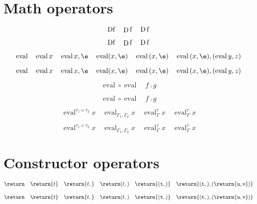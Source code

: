 \documentclass{article}
\DeclareMathOperator{\eval}{eval}
\begin{document}
\section{Math operators}

\begin{verbatim*}

\DeclareMathOperator{\eval}{eval}
\DeclareMathInfix{\comp}{;}
\end{verbatim*}

\begin{verbatim*}
\[
\mathfont{D} f\quad
\mathop{D} f\quad
\mymathop{D} f
\]
\end{verbatim*}
%
\[
  \mathfont{D} f \quad
  \mathop{D} f \quad
  \mymathop{D} f
\]

\begin{verbatim*}
\[
\eval\quad
\eval{x}\quad
\eval{x,\e}\quad
\eval(x,\e)\quad
\eval{(x,\e)}\quad
\eval{{(x,\e)},(\eval{y,z})}
\]
\end{verbatim*}
%
\[
  \eval           \quad
  \eval{x}        \quad
  \eval{x,\e}     \quad
  \eval(x,\e)     \quad
  \eval{(x,\e)} \quad
  \eval{{(x,\e)},(\eval{y,z})}
\]

\begin{verbatim*}
\[
\eval \circ \eval\quad
f \comp g
\]
\end{verbatim*}
%
\[
  \eval \circ \eval\quad
  f \comp g
\]

\begin{verbatim*}
\[
\eval^{\tau_1\times\tau_2}{x}\quad
\eval_{\Gamma_1,\Gamma_2}{x}\quad
\eval^\tau_\Gamma{x}\quad
\eval_\Gamma^\tau{x}
\]
\end{verbatim*}
%
\[
  \eval^{\tau_1 \times \tau_2}{x} \quad
  \eval_{\Gamma_1, \Gamma_2}{x}   \quad
  \eval^\tau_\Gamma{x}            \quad
  \eval_\Gamma^\tau{x}
\]

\section{Constructor operators}

\begin{verbatim*}
\def\constructorfont{\mathsf}

\DeclareConstructorInfix{\cons}{\dblcolon}
\end{verbatim*}

\begin{verbatim*}
\[
\return\quad
\return{t}\quad
\return{t,\tt}\quad
\return(t,\tt)\quad
\return{{(t,\tt)}}\quad
\return{(t,\tt),(\return{u,v})}
\]
\end{verbatim*}
%
\[
  \return            \quad
  \return{t}         \quad
  \return{t,\tt}     \quad
  \return(t,\tt)     \quad
  \return{{(t,\tt)}} \quad
  \return{(t,\tt),(\return{u,v})}
\]
\end{document}
